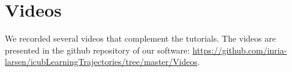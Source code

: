 \documentclass[utf8]{frontiersSCNS} %
\begin{document}
%
%
%
%
%



\section{Videos}
\label{sec:video}
%

We recorded several videos that complement the tutorials. The videos are presented in the github repository of our software:
\url{https://github.com/inria-larsen/icubLearningTrajectories/tree/master/Videos}.

% 
%
% 
%
%
%
%
\end{document}
